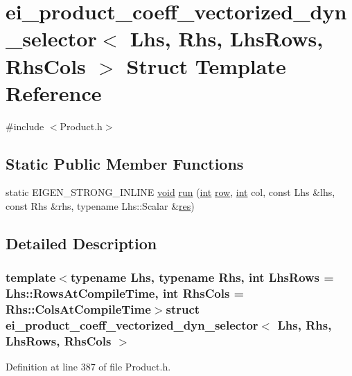 \hypertarget{structei__product__coeff__vectorized__dyn__selector}{\section{ei\-\_\-product\-\_\-coeff\-\_\-vectorized\-\_\-dyn\-\_\-selector$<$ Lhs, Rhs, Lhs\-Rows, Rhs\-Cols $>$ Struct Template Reference}
\label{structei__product__coeff__vectorized__dyn__selector}
}


{\ttfamily \#include $<$Product.\-h$>$}

\subsection*{Static Public Member Functions}
\begin{DoxyCompactItemize}
\item 
static E\-I\-G\-E\-N\-\_\-\-S\-T\-R\-O\-N\-G\-\_\-\-I\-N\-L\-I\-N\-E \hyperlink{group___u_a_v_objects_plugin_ga444cf2ff3f0ecbe028adce838d373f5c}{void} \hyperlink{structei__product__coeff__vectorized__dyn__selector_a65089baf77e52c274b032e0aba0ce3b1}{run} (\hyperlink{ioapi_8h_a787fa3cf048117ba7123753c1e74fcd6}{int} \hyperlink{glext_8h_a11b277b422822f784ee248b43eee3e1e}{row}, \hyperlink{ioapi_8h_a787fa3cf048117ba7123753c1e74fcd6}{int} col, const Lhs \&lhs, const Rhs \&rhs, typename Lhs\-::\-Scalar \&\hyperlink{glext_8h_a1dbb21208b9047cc8031ca9c840d3c2f}{res})
\end{DoxyCompactItemize}


\subsection{Detailed Description}
\subsubsection*{template$<$typename Lhs, typename Rhs, int Lhs\-Rows = Lhs\-::\-Rows\-At\-Compile\-Time, int Rhs\-Cols = Rhs\-::\-Cols\-At\-Compile\-Time$>$struct ei\-\_\-product\-\_\-coeff\-\_\-vectorized\-\_\-dyn\-\_\-selector$<$ Lhs, Rhs, Lhs\-Rows, Rhs\-Cols $>$}



Definition at line 387 of file Product.\-h.



